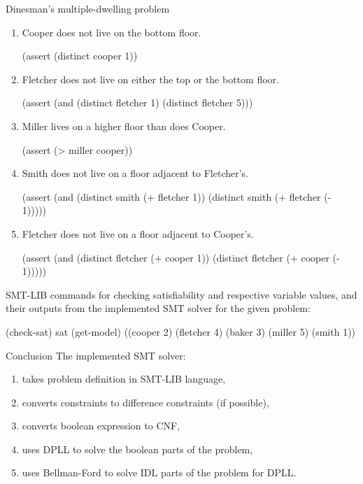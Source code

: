 \documentclass{beamer}
\begin{document}
\begin{frame}[fragile,t]
\begin{columns}[t,onlytextwidth]
\begin{column}{0.485\textwidth}
\begin{block}{Dinesman's multiple-dwelling problem}
\begin{enumerate}
				\item Cooper does not live on the bottom floor.
				\begin{smtlib}
					(assert (distinct cooper 1))
				\end{smtlib}
				
				\item Fletcher does not live on either the top or the bottom floor.
				\begin{smtlib}
					(assert (and (distinct fletcher 1)
					             (distinct fletcher 5)))
				\end{smtlib}
			
				\item Miller lives on a higher floor than does Cooper.
				\begin{smtlib}
					(assert (> miller cooper))
				\end{smtlib}
			
				\item Smith does not live on a floor adjacent to Fletcher's.
				\begin{smtlib}
					(assert (and (distinct smith (+ fletcher 1))
					             (distinct smith (+ fletcher (- 1)))))
				\end{smtlib}
			
				\item Fletcher does not live on a floor adjacent to Cooper's.
				\begin{smtlib}
					(assert (and (distinct fletcher (+ cooper 1))
					             (distinct fletcher (+ cooper (- 1)))))
				\end{smtlib}
			\end{enumerate}
		
			SMT-LIB commands for checking satisfiability and respective variable values, and their outputs from the implemented SMT solver for the given problem:
			\begin{smtlib}
				(check-sat)
				sat
				(get-model)
				((cooper 2) (fletcher 4) (baker 3) (miller 5) (smith 1))
			\end{smtlib}
		\end{block}
	
		\begin{block}{Conclusion}
			The implemented SMT solver:
			\begin{enumerate}
				\item takes problem definition in SMT-LIB language,
				\item converts constraints to difference constraints (if possible),
				\item converts boolean expression to CNF,
				\item uses DPLL to solve the boolean parts of the problem,
				\item uses Bellman-Ford to solve IDL parts of the problem for DPLL.
			\end{enumerate}


\end{block}
\end{column}
\end{columns}
\end{frame}
\end{document}
